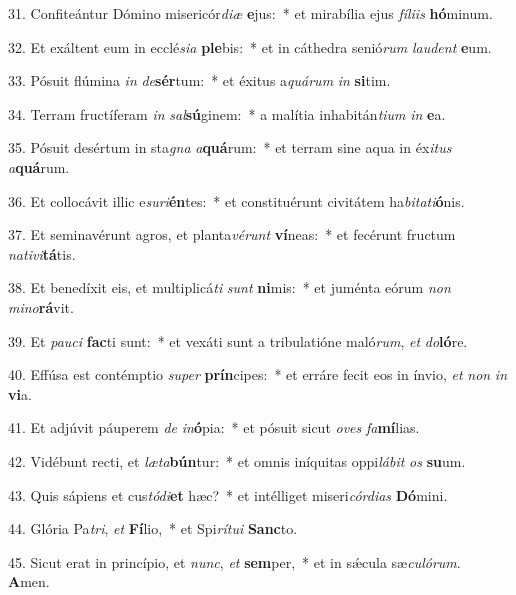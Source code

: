 31. Confiteántur Dómino misericór\textit{di}\textit{æ} \textbf{e}jus:~*  et mirabília ejus \textit{fí}\textit{li}\textit{is} \textbf{hó}minum.\

32. Et exáltent eum in ecclé\textit{si}\textit{a} \textbf{ple}bis:~*  et in cáthedra senió\textit{rum} \textit{lau}\textit{dent} \textbf{e}um.\

33. Pósuit flúmina \textit{in} \textit{de}\textbf{sér}tum:~*  et éxitus a\textit{quá}\textit{rum} \textit{in} \textbf{si}tim.\

34. Terram fructíferam \textit{in} \textit{sal}\textbf{sú}ginem:~*  a malítia inhabitán\textit{ti}\textit{um} \textit{in} \textbf{e}a.\

35. Pósuit desértum in sta\textit{gna} \textit{a}\textbf{quá}rum:~*  et terram sine aqua in éx\textit{i}\textit{tus} \textit{a}\textbf{quá}rum.\

36. Et collocávit illic e\textit{su}\textit{ri}\textbf{én}tes:~*  et constituérunt civitátem ha\textit{bi}\textit{ta}\textit{ti}\textbf{ó}nis.\

37. Et seminavérunt agros, et planta\textit{vé}\textit{runt} \textbf{ví}neas:~*  et fecérunt fructum \textit{na}\textit{ti}\textit{vi}\textbf{tá}tis.\

38. Et benedíxit eis, et multiplicá\textit{ti} \textit{sunt} \textbf{ni}mis:~*  et juménta eórum \textit{non} \textit{mi}\textit{no}\textbf{rá}vit.\

39. Et \textit{pau}\textit{ci} \textbf{fac}ti sunt:~*  et vexáti sunt a tribulatióne maló\textit{rum}, \textit{et} \textit{do}\textbf{ló}re.\

40. Effúsa est contémptio \textit{su}\textit{per} \textbf{prín}cipes:~*  et erráre fecit eos in ínvio, \textit{et} \textit{non} \textit{in} \textbf{vi}a.\

41. Et adjúvit páuperem \textit{de} \textit{in}\textbf{ó}pia:~*  et pósuit sicut \textit{o}\textit{ves} \textit{fa}\textbf{mí}lias.\

42. Vidébunt recti, et \textit{læ}\textit{ta}\textbf{bún}tur:~*  et omnis iníquitas oppi\textit{lá}\textit{bit} \textit{os} \textbf{su}um.\

43. Quis sápiens et cus\textit{tó}\textit{di}\textbf{et} hæc?~*  et intélliget miseri\textit{cór}\textit{di}\textit{as} \textbf{Dó}mini.\

44. Glória Pa\textit{tri}, \textit{et} \textbf{Fí}lio,~*  et Spi\textit{rí}\textit{tu}\textit{i} \textbf{Sanc}to.\

45. Sicut erat in princípio, et \textit{nunc}, \textit{et} \textbf{sem}per,~*  et in sǽcula sæ\textit{cu}\textit{ló}\textit{rum}. \textbf{A}men.\

